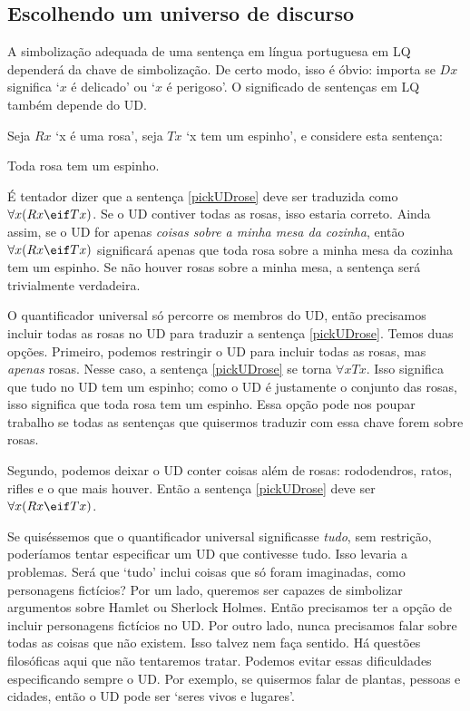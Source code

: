 \subsection{Escolhendo um universo de discurso}
A simbolização adequada de uma sentença em língua portuguesa em LQ dependerá da chave de simbolização. De certo modo, isso é óbvio: importa se $Dx$ significa `$x$ é delicado' ou `$x$ é perigoso'. O significado de sentenças em LQ também depende do UD.

Seja $Rx$ `x é uma rosa', seja $Tx$ `x tem um espinho', e considere esta sentença:
\begin{earg}
\item[\ex{pickUDrose}] Toda rosa tem um espinho.
\end{earg}

É tentador dizer que a sentença \ref{pickUDrose} deve ser traduzida como $\forall x(Rx \eif Tx)$. Se o UD contiver todas as rosas, isso estaria correto. Ainda assim, se o UD for apenas \emph{coisas sobre a minha mesa da cozinha}, então $\forall x(Rx \eif Tx)$ significará apenas que toda rosa sobre a minha mesa da cozinha tem um espinho. Se não houver rosas sobre a minha mesa, a sentença será trivialmente verdadeira.

O quantificador universal só percorre os membros do UD, então precisamos incluir todas as rosas no UD para traduzir a sentença \ref{pickUDrose}. Temos duas opções. Primeiro, podemos restringir o UD para incluir todas as rosas, mas \emph{apenas} rosas. Nesse caso, a sentença \ref{pickUDrose} se torna $\forall x Tx$. Isso significa que tudo no UD tem um espinho; como o UD é justamente o conjunto das rosas, isso significa que toda rosa tem um espinho. Essa opção pode nos poupar trabalho se todas as sentenças que quisermos traduzir com essa chave forem sobre rosas.

Segundo, podemos deixar o UD conter coisas além de rosas: rododendros, ratos, rifles e o que mais houver. Então a sentença \ref{pickUDrose} deve ser $\forall x(Rx \eif Tx)$.

Se quiséssemos que o quantificador universal significasse \emph{tudo}, sem restrição, poderíamos tentar especificar um UD que contivesse tudo. Isso levaria a problemas. Será que `tudo' inclui coisas que só foram imaginadas, como personagens fictícios? Por um lado, queremos ser capazes de simbolizar argumentos sobre Hamlet ou Sherlock Holmes. Então precisamos ter a opção de incluir personagens fictícios no UD. Por outro lado, nunca precisamos falar sobre todas as coisas que não existem. Isso talvez nem faça sentido. Há questões filosóficas aqui que não tentaremos tratar. Podemos evitar essas dificuldades especificando sempre o UD. Por exemplo, se quisermos falar de plantas, pessoas e cidades, então o UD pode ser `seres vivos e lugares'.

